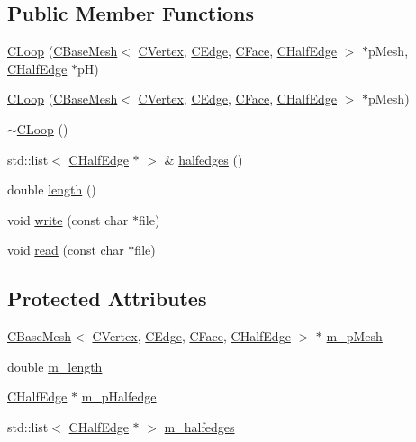 \subsection*{Public Member Functions}
\begin{DoxyCompactItemize}
\item 
\hyperlink{class_mesh_lib_1_1_c_loop_ab5608d60065d49d97e7ab5173b84c8b6}{C\+Loop} (\hyperlink{class_mesh_lib_1_1_c_base_mesh}{C\+Base\+Mesh}$<$ \hyperlink{class_mesh_lib_1_1_c_vertex}{C\+Vertex}, \hyperlink{class_mesh_lib_1_1_c_edge}{C\+Edge}, \hyperlink{class_mesh_lib_1_1_c_face}{C\+Face}, \hyperlink{class_mesh_lib_1_1_c_half_edge}{C\+Half\+Edge} $>$ $\ast$p\+Mesh, \hyperlink{class_mesh_lib_1_1_c_half_edge}{C\+Half\+Edge} $\ast$pH)
\item 
\hyperlink{class_mesh_lib_1_1_c_loop_ab3142314d0e6fefd57fd4a6339fd86cf}{C\+Loop} (\hyperlink{class_mesh_lib_1_1_c_base_mesh}{C\+Base\+Mesh}$<$ \hyperlink{class_mesh_lib_1_1_c_vertex}{C\+Vertex}, \hyperlink{class_mesh_lib_1_1_c_edge}{C\+Edge}, \hyperlink{class_mesh_lib_1_1_c_face}{C\+Face}, \hyperlink{class_mesh_lib_1_1_c_half_edge}{C\+Half\+Edge} $>$ $\ast$p\+Mesh)
\item 
\hyperlink{class_mesh_lib_1_1_c_loop_a167b5a15311a3c0bc8a676316894595d}{$\sim$\+C\+Loop} ()
\item 
std\+::list$<$ \hyperlink{class_mesh_lib_1_1_c_half_edge}{C\+Half\+Edge} $\ast$ $>$ \& \hyperlink{class_mesh_lib_1_1_c_loop_a77fea4b74d23423e5889f2046d997cbf}{halfedges} ()
\item 
double \hyperlink{class_mesh_lib_1_1_c_loop_af56b2cace83571be3b745528e8985131}{length} ()
\item 
void \hyperlink{class_mesh_lib_1_1_c_loop_a86a97b1d9b30030dd5b04544cb1052c4}{write} (const char $\ast$file)
\item 
void \hyperlink{class_mesh_lib_1_1_c_loop_a200d03806ae46c7afed2bca200298487}{read} (const char $\ast$file)
\end{DoxyCompactItemize}
\subsection*{Protected Attributes}
\begin{DoxyCompactItemize}
\item 
\hyperlink{class_mesh_lib_1_1_c_base_mesh}{C\+Base\+Mesh}$<$ \hyperlink{class_mesh_lib_1_1_c_vertex}{C\+Vertex}, \hyperlink{class_mesh_lib_1_1_c_edge}{C\+Edge}, \hyperlink{class_mesh_lib_1_1_c_face}{C\+Face}, \hyperlink{class_mesh_lib_1_1_c_half_edge}{C\+Half\+Edge} $>$ $\ast$ \hyperlink{class_mesh_lib_1_1_c_loop_a4656ced7a75ac9a63bc5925bb667ee55}{m\+\_\+p\+Mesh}
\item 
double \hyperlink{class_mesh_lib_1_1_c_loop_a3886caa41e199204666ca08dcf90f847}{m\+\_\+length}
\item 
\hyperlink{class_mesh_lib_1_1_c_half_edge}{C\+Half\+Edge} $\ast$ \hyperlink{class_mesh_lib_1_1_c_loop_ad8bcb68b8cafda18031803a855b1c47a}{m\+\_\+p\+Halfedge}
\item 
std\+::list$<$ \hyperlink{class_mesh_lib_1_1_c_half_edge}{C\+Half\+Edge} $\ast$ $>$ \hyperlink{class_mesh_lib_1_1_c_loop_a52708198f9b27b7aba3f3df30f46bb5e}{m\+\_\+halfedges}
\end{DoxyCompactItemize}


